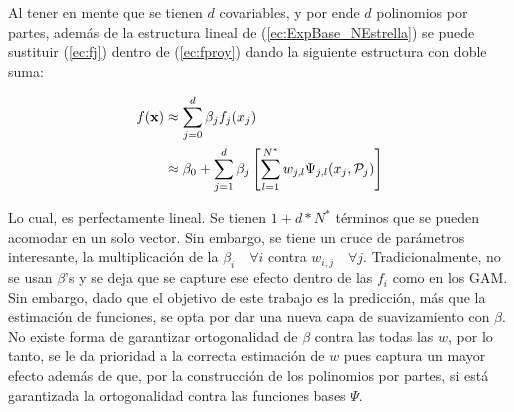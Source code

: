 \documentclass[../Main/Main.tex]{subfiles}
\begin{document}
Al tener en mente que se tienen $d$ covariables, y por ende $d$ polinomios por partes, además de la estructura lineal de (\ref{ec:ExpBase_NEstrella}) se puede sustituir (\ref{ec:fj}) dentro de (\ref{ec:fproy}) dando la siguiente estructura con doble suma:

\begin{align*}
	f(\mathbf{x}) &\approx \sum_{j=0}^d \beta_j f_j(x_j) \\
			&\approx \beta_0 + \sum_{j=1}^d \beta_j \left[\sum_{l=1}^{N^*} w_{j,l}\Psi_{j,l}(x_j, \mathcal{P}_j)\right]
\end{align*}

Lo cual, es perfectamente lineal. Se tienen $1 + d*N^*$ términos que se pueden acomodar en un solo vector. Sin embargo, se tiene un cruce de parámetros interesante, la multiplicación de la $\beta_i\quad \forall i$ contra $w_{i,j} \quad \forall j$. Tradicionalmente, no se usan $\beta$'s y se deja que se capture ese efecto dentro de las $f_i$ como en los GAM. Sin embargo, dado que el objetivo de este trabajo es la predicción, más que la estimación de funciones, se opta por dar una nueva capa de suavizamiento con $\beta$. No existe forma de garantizar ortogonalidad de $\beta$ contra las todas las $w$, por lo tanto, se le da prioridad a la correcta estimación de $w$ pues captura un mayor efecto además de que, por la construcción de los polinomios por partes, si está garantizada la ortogonalidad contra las funciones bases $\Psi$.
\end{document}
